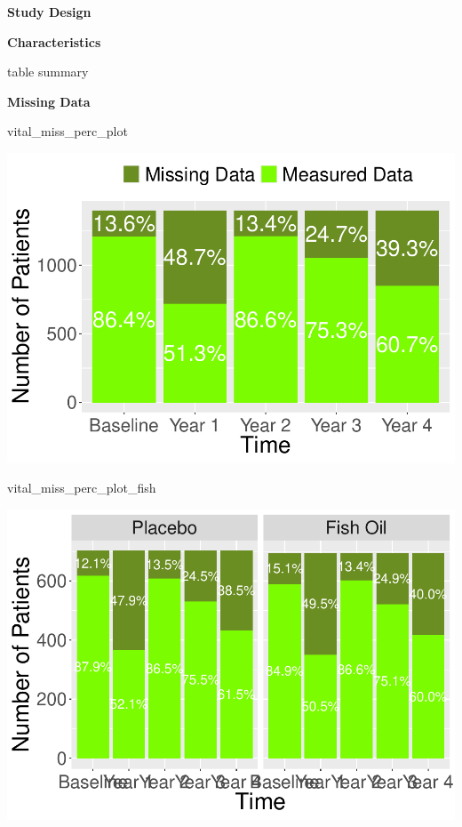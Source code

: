 \documentclass{article}
\newenvironment{Shaded}{\begin{snugshade}}{\end{snugshade}}
\newcommand{\NormalTok}[1]{#1}
\newcommand{\pandocbounded}[1]{#1}
\begin{document}
\textbf{Study Design}

\textbf{Characteristics}

table summary

\textbf{Missing Data}

\begin{Shaded}
\begin{Highlighting}[]
\NormalTok{vital\_miss\_perc\_plot}
\end{Highlighting}
\end{Shaded}

\pandocbounded{\includegraphics[keepaspectratio]{Final_Report_files/figure-latex/unnamed-chunk-2-1.pdf}}

\begin{Shaded}
\begin{Highlighting}[]
\NormalTok{vital\_miss\_perc\_plot\_fish}
\end{Highlighting}
\end{Shaded}

\pandocbounded{\includegraphics[keepaspectratio]{Final_Report_files/figure-latex/unnamed-chunk-2-2.pdf}}
\end{document}
